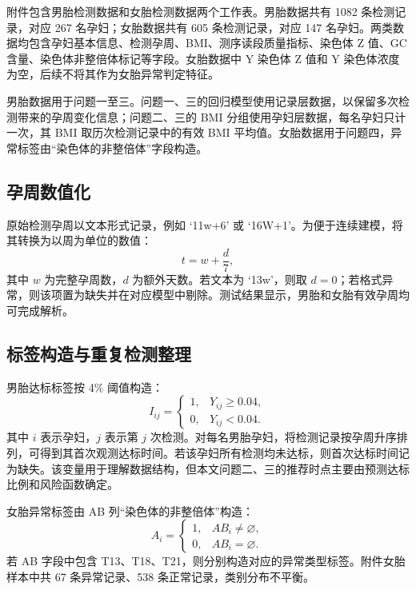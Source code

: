 \documentclass[UTF8,zihao=-4]{ctexart}
\numberwithin{equation}{section}
\begin{document}
附件包含男胎检测数据和女胎检测数据两个工作表。男胎数据共有 1082 条检测记录，对应 267 名孕妇；女胎数据共有 605 条检测记录，对应 147 名孕妇。两类数据均包含孕妇基本信息、检测孕周、BMI、测序读段质量指标、染色体 Z 值、GC 含量、染色体非整倍体标记等字段。女胎数据中 Y 染色体 Z 值和 Y 染色体浓度为空，后续不将其作为女胎异常判定特征。

男胎数据用于问题一至三。问题一、三的回归模型使用记录层数据，以保留多次检测带来的孕周变化信息；问题二、三的 BMI 分组使用孕妇层数据，每名孕妇只计一次，其 BMI 取历次检测记录中的有效 BMI 平均值。女胎数据用于问题四，异常标签由“染色体的非整倍体”字段构造。

\subsection{孕周数值化}

原始检测孕周以文本形式记录，例如 `11w+6' 或 `16W+1'。为便于连续建模，将其转换为以周为单位的数值：
\begin{equation}
t=w+\frac{d}{7},
\end{equation}
其中 $w$ 为完整孕周数，$d$ 为额外天数。若文本为 `13w'，则取 $d=0$；若格式异常，则该项置为缺失并在对应模型中剔除。测试结果显示，男胎和女胎有效孕周均可完成解析。

\subsection{标签构造与重复检测整理}

男胎达标标签按 4\% 阈值构造：
\begin{equation}
I_{ij}=
\begin{cases}
1,&Y_{ij}\ge 0.04,\\
0,&Y_{ij}<0.04.
\end{cases}
\end{equation}
其中 $i$ 表示孕妇，$j$ 表示第 $j$ 次检测。对每名男胎孕妇，将检测记录按孕周升序排列，可得到其首次观测达标时间。若该孕妇所有检测均未达标，则首次达标时间记为缺失。该变量用于理解数据结构，但本文问题二、三的推荐时点主要由预测达标比例和风险函数确定。

女胎异常标签由 AB 列“染色体的非整倍体”构造：
\begin{equation}
A_i=
\begin{cases}
1,&AB_i\neq \varnothing,\\
0,&AB_i=\varnothing.
\end{cases}
\end{equation}
若 AB 字段中包含 T13、T18、T21，则分别构造对应的异常类型标签。附件女胎样本中共 67 条异常记录、538 条正常记录，类别分布不平衡。
\end{document}
